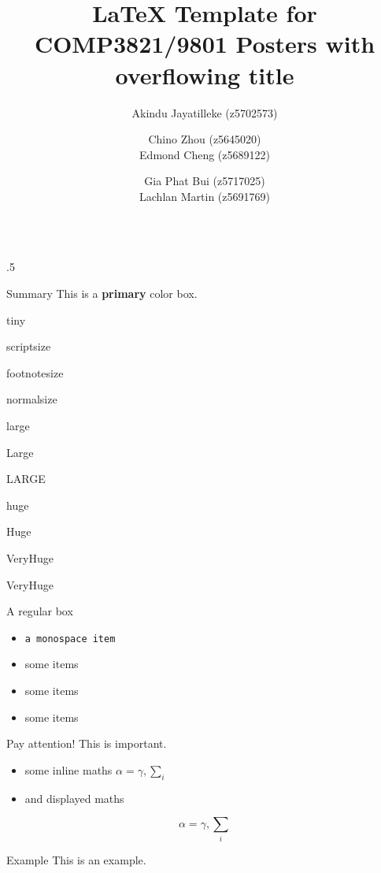 \documentclass[final,hyperref={pdfpagelabels=false}]{beamer}
\title{\LaTeX{} Template for COMP3821/9801 Posters with overflowing title}
\author{Akindu Jayatilleke (z5702573) \and Chino Zhou (z5645020)\\ Edmond Cheng (z5689122) \and Gia Phat Bui (z5717025)\\ Lachlan Martin (z5691769)}
\institute{Mentor: mentor name\\
  Group: group number}
\date{}
\begin{document}
\begin{frame}{}
  \vfill
  \begin{columns}[t]
    \begin{column}{.5\linewidth}
      \begin{mybox}{Summary}
        This is a \textbf{primary} color box.

        \centering
        {\tiny tiny}\par
        {\scriptsize scriptsize}\par
        {\footnotesize footnotesize}\par
        {\normalsize normalsize}\par
        {\large large}\par
        {\Large Large}\par
        {\LARGE LARGE}\par
        {\huge huge}\par
        {\Huge Huge}\par
        {\veryHuge VeryHuge}\par
        {\VeryHuge VeryHuge}\par
      \end{mybox}

      \begin{myindigobox}{A regular box}
        \begin{itemize}
          \item \texttt{a monospace item}
          \item some items
          \item some items
          \item some items
        \end{itemize}
      \end{myindigobox}

      \begin{myredbox}{Pay attention!}
        This is important.
        \begin{itemize}
          \item some inline maths $\alpha=\gamma, \sum_{i}$
          \item and displayed maths
        \end{itemize}
        $$\alpha=\gamma, \sum_{i}$$
      \end{myredbox}

      \begin{mygreenbox}{Example}
        This is an example.
      \end{mygreenbox}


\end{column}
\end{columns}
\end{frame}
\end{document}

